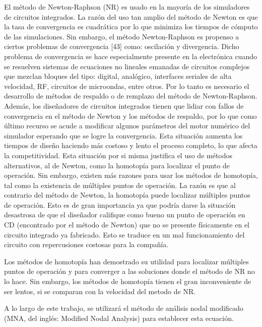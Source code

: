\documentclass[conference,letterpaper,onecolumn]{IEEEtran}
\begin{document}
El m\'etodo de Newton-Raphson  (NR) es usado en la mayor{\'i}a de los simuladores de circuitos integrados.  La raz\'on del uso tan amplio del m\'etodo de Newton es que la tasa de convergencia es cuadr\'atica \cite{cont_quasi} por lo que minimiza los tiempos de c\'omputo de las simulaciones. Sin embargo, el m\'etodo Newton-Raphson es propenso a ciertos problemas de convergencia [43] como: oscilaci\'on y divergencia. Dicho problema de convergencia  se hace especialmente presente en la electr\'onica cuando se resuelven sistemas de ecuaciones no lineales emanadas de circuitos complejos que mezclan bloques del tipo: digital, anal\'ogico, interfaces seriales de alta velocidad, RF, circuitos de microondas, entre otros. Por lo tanto es necesario el desarrollo de m\'etodos de respaldo o de remplazo
del m\'etodo de Newton-Raphson. Adem\'as, los dise\~nadores de circuitos integrados tienen que lidiar con fallos de convergencia en el m\'etodo de Newton y los m\'etodos de respaldo, por lo que como \'ultimo recurso se acude a modificar algunos par\'ametros del motor num\'erico del simulador esperando que se logre la convergencia. Esta situaci\'on aumenta los tiempos de dise\~no haciendo m\'as costoso y lento el proceso completo, lo que afecta la competitividad. Esta situaci\'on por si misma justifica el uso de m\'etodos alternativos, al de Newton, como la homotop{\'i}a para localizar el punto de operaci\'on. Sin embargo, existen m\'as razones para usar los m\'etodos de homotop{\'i}a, tal como la existencia de m\'ultiples puntos de operaci\'on. La raz\'on es que al contrario del m\'etodo de Newton, la homotop{\'i}a \cite{netwth_lasr,homo_iscas05,homo_ArtificialP} puede localizar m\'ultiples puntos de operaci\'on. Esto es de gran importancia ya que  podr{\'i}a darse la situaci\'on desastrosa de que el dise\~nador califique como bueno un punto de operaci\'on en CD (encontrado por el m\'etodo de Newton) que no se presente f{\'i}sicamente en el circuito integrado ya fabricado. Esto se traduce en un mal funcionamiento del circuito con repercusiones costosas para la compa\~n{\'i}a.

Los m\'etodos de homotop{\'i}a \cite{cont_bra,cont_kao,cont_chu1,cont_leu11,cont_ritch} han demostrado su utilidad para localizar m\'ultiples puntos de operaci\'on y para converger a las soluciones donde el m\'etodo de NR no lo hace. Sin embargo, los m\'etodos de homotop{\'i}a tienen el gran
inconveniente de ser lentos, si se comparan con la velocidad del metodo de NR.

A lo largo de este trabajo, se utilizar\'a el m\'etodo de an\'alisis nodal modificado \cite{mnaxx,stat_1}
(MNA, del ingl\'es: Modified Nodal Analysis) para establecer esta ecuaci\'on.
\end{document}
